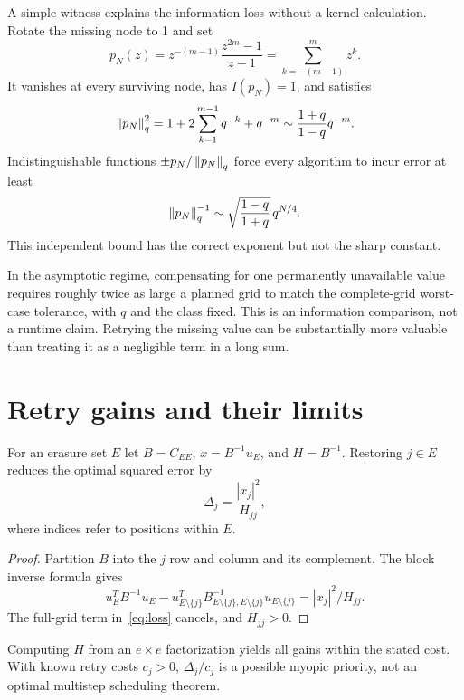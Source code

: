 \documentclass[final,leqno,letterpaper]{etna}
\begin{document}
A simple witness explains the information loss without a kernel calculation. Rotate the missing node to 1 and set
\begin{equation*}
p_N(z)=z^{-(m-1)}\frac{z^{2m}-1}{z-1}
=\sum_{k=-(m-1)}^m z^k.
\end{equation*}
It vanishes at every surviving node, has $I(p_N)=1$, and satisfies
\begin{equation*}
\left\lVert p_N\right\rVert_q^2=1+2\sum_{k=1}^{m-1}q^{-k}+q^{-m}
\sim\frac{1+q}{1-q}q^{-m}.
\end{equation*}
Indistinguishable functions $\pm p_N/\left\lVert p_N\right\rVert_q$ force every algorithm to incur error at least
\[
\left\lVert p_N\right\rVert_q^{-1}\sim\sqrt{\frac{1-q}{1+q}}\,q^{N/4}.
\]
This independent bound has the correct exponent but not the sharp constant.

In the asymptotic regime, compensating for one permanently unavailable value requires roughly twice as large a planned grid to match the complete-grid worst-case tolerance, with $q$ and the class fixed. This is an information comparison, not a runtime claim. Retrying the missing value can be substantially more valuable than treating it as a negligible term in a long sum.

\FloatBarrier
\section{Retry gains and their limits}
\begin{proposition}\label{prop:gain}
For an erasure set $E$ let $B=C_{EE}$, $x=B^{-1}u_E$, and $H=B^{-1}$. Restoring $j\in E$ reduces the optimal squared error by
\begin{equation}
\Delta_j=\frac{|x_j|^2}{H_{jj}},
\label{eq:gain}
\end{equation}
where indices refer to positions within $E$.
\end{proposition}
\begin{proof}
Partition $B$ into the $j$ row and column and its complement. The block inverse formula gives
\[
u_E^TB^{-1}u_E-u_{E\setminus\{j\}}^T
B_{E\setminus\{j\},E\setminus\{j\}}^{-1}u_{E\setminus\{j\}}
=|x_j|^2/H_{jj}.
\]
The full-grid term in~\eqref{eq:loss} cancels, and $H_{jj}>0$.
\end{proof}
Computing $H$ from an $e\times e$ factorization yields all gains within the stated cost. With known retry costs $c_j>0$, $\Delta_j/c_j$ is a possible myopic priority, not an optimal multistep scheduling theorem.
\end{document}

